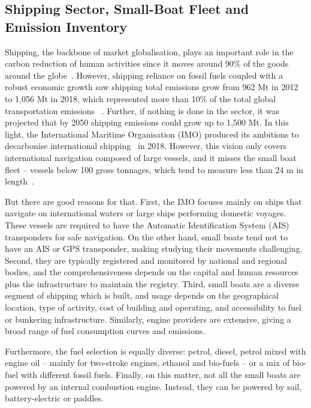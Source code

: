 \subsection{Shipping Sector, Small-Boat Fleet and Emission Inventory}
Shipping, the backbone of market globalisation, plays an important role in the carbon reduction of human activities since it moves around 90\% of the goods around the globe~\cite{walker2019environmental}. However, shipping reliance on fossil fuels coupled with a robust economic growth saw shipping total  emissions grow from 962 Mt in 2012 to 1,056 Mt in 2018, which represented more than 10\% of the total global transportation emissions ~\cite{IMO2021Fourth}. Further, if nothing is done in the sector, it was projected that by 2050 shipping  emissions could grow up to 1,500 Mt. In this light, the International Maritime Organisation (IMO) produced its ambitions to decarbonise international shipping~\cite{imo2018adoption} in 2018. However, this vision only covers international navigation composed of large vessels, and it misses the small boat fleet – vessels below 100 gross tonnages, which tend to measure less than 24 m in length~\cite{uk2021Operational}.

But there are good reasons for that. First, the IMO focuses mainly on ships that navigate on international waters or large ships performing domestic voyages. These vessels are required to have the Automatic Identification System (AIS) transponders for safe navigation. On the other hand, small boats tend not to have an AIS or GPS transponder, making studying their movements challenging. Second, they are typically registered and monitored by national and regional bodies, and the comprehensiveness depends on the capital and human resources plus the infrastructure to maintain the registry. Third, small boats are a diverse segment of shipping which is built, and usage depends on the geographical location, type of activity, cost of building and operating, and accessibility to fuel or bunkering infrastructure. Similarly, engine providers are extensive, giving a broad range of fuel consumption curves and emissions.

Furthermore, the fuel selection is equally diverse: petrol, diesel, petrol mixed with engine oil – mainly for two-stroke engines, ethanol and bio-fuels – or a mix of bio-fuel with different fossil fuels. Finally, on this matter, not all the small boats are powered by an internal combustion engine. Instead, they can be powered by sail, battery-electric or paddles.

